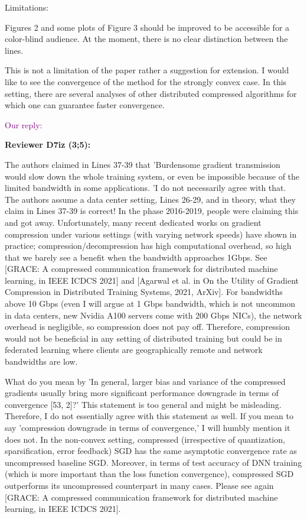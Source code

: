 \documentclass{article}
\begin{document}
Limitations:

Figures 2 and some plots of Figure 3 should be improved to be accessible for a color-blind audience. At the moment, there is no clear distinction between the lines.

This is not a limitation of the paper rather a suggestion for extension. I would like to see the convergence of the method for the strongly convex case. In this setting, there are several analyses of other distributed compressed algorithms for which one can guarantee faster convergence.

\textcolor{purple}{Our reply:}



\textbf{Reviewer D7iz (3;5):}


The authors claimed in Lines 37-39 that 'Burdensome gradient transmission would slow down the whole training system, or even be impossible because of the limited bandwidth in some applications. 'I do not necessarily agree with that. The authors assume a data center setting, Lines 26-29, and in theory, what they claim in Lines 37-39 is correct! In the phase 2016-2019, people were claiming this and got away. Unfortunately, many recent dedicated works on gradient compression under various settings (with varying network speeds) have shown in practice; compression/decompression has high computational overhead, so high that we barely see a benefit when the bandwidth approaches 1Gbps. See [GRACE: A compressed communication framework for distributed machine learning, in IEEE ICDCS 2021] and [Agarwal et al. in On the Utility of Gradient Compression in Distributed Training Systems, 2021, ArXiv]. For bandwidths above 10 Gbps (even I will argue at 1 Gbps bandwidth, which is not uncommon in data centers, new Nvidia A100 servers come with 200 Gbps NICs), the network overhead is negligible, so compression does not pay off. Therefore, compression would not be beneficial in any setting of distributed training but could be in federated learning where clients are geographically remote and network bandwidths are low.

What do you mean by 'In general, larger bias and variance of the compressed gradients usually bring more significant performance downgrade in terms of convergence [53, 2]?' This statement is too general and might be misleading. Therefore, I do not essentially agree with this statement as well. If you mean to say 'compression downgrade in terms of convergence,' I will humbly mention it does not. In the non-convex setting, compressed (irrespective of quantization, sparsification, error feedback) SGD has the same asymptotic convergence rate as uncompressed baseline SGD. Moreover, in terms of test accuracy of DNN training (which is more important than the loss function convergence), compressed SGD outperforms its uncompressed counterpart in many cases. Please see again [GRACE: A compressed communication framework for distributed machine learning, in IEEE ICDCS 2021].
\end{document}
